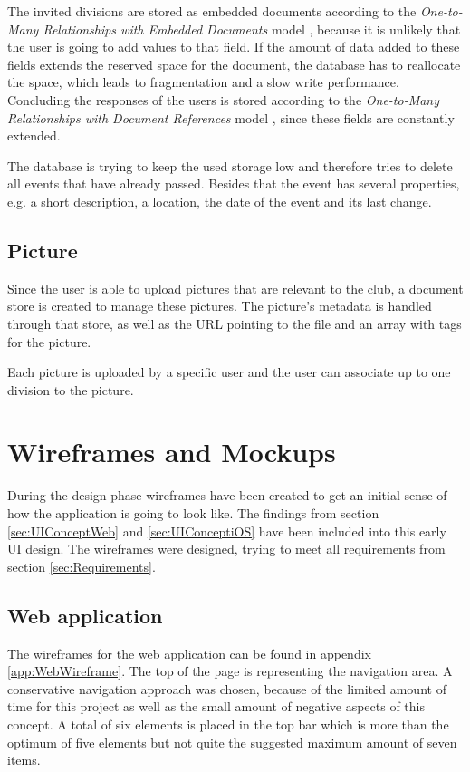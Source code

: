 The invited divisions are stored as embedded documents according to the \emph{One-to-Many Relationships with Embedded Documents} model \cite[p. 141]{Mongo:2014aa}, because it is unlikely that the user is going to add values to that field. If the amount of data added to these fields extends the reserved space for the document, the database has to reallocate the space, which leads to fragmentation and a slow write performance. Concluding the responses of the users is stored according to the \emph{One-to-Many Relationships with Document References} model \cite[p. 143]{Mongo:2014aa}, since these fields are constantly extended.

The database is trying to keep the used storage low and therefore tries to delete all events that have already passed. Besides that the event has several properties, e.g. a short description, a location, the date of the event and its last change.

\subsection{Picture}
Since the user is able to upload pictures that are relevant to the club, a document store is created to manage these pictures. The picture's metadata is handled through that store, as well as the URL pointing to the file and an array with tags for the picture.

Each picture is uploaded by a specific user and the user can associate up to one division to the picture.

\section{Wireframes and Mockups}
\label{sec:Wireframes}

During the design phase wireframes have been created to get an initial sense of how the application is going to look like. The findings from section \vref{sec:UIConceptWeb} and \vref{sec:UIConceptiOS} have been included into this early \gls{UI} design. The wireframes were designed, trying to meet all requirements from section \vref{sec:Requirements}.

\subsection{Web application}

The wireframes for the web application can be found in appendix \vref{app:WebWireframe}. The top of the page is representing the navigation area. A conservative navigation approach was chosen, because of the limited amount of time for this project as well as the small amount of negative aspects of this concept. A total of six elements is placed in the top bar which is more than the optimum of five elements but not quite the suggested maximum amount of seven items.

